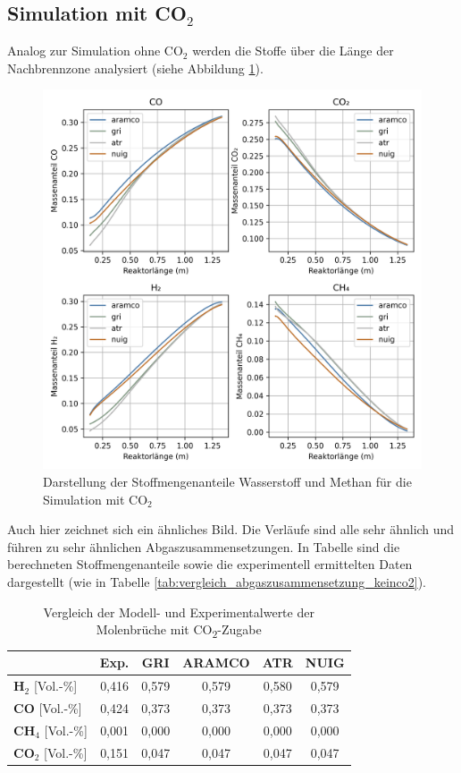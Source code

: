 \documentclass[footmark=none]{tubaf-thesis}
\begin{document}
        \subsection{Simulation mit CO$_2$}
        Analog zur Simulation ohne CO$_2$ werden die Stoffe über die Länge der Nachbrennzone analysiert (siehe Abbildung \ref{fig:vergleich_h2_ch4_co2}).
        \begin{figure}[H]
            \centering
            \includegraphics[width=0.8\linewidth]{img_py/H2_CH4_CO_CO2.png}
            \caption{Darstellung der Stoffmengenanteile Wasserstoff und Methan für die Simulation mit CO$_2$}
            \label{fig:vergleich_h2_ch4_co2}
        \end{figure}
        Auch hier zeichnet sich ein ähnliches Bild. Die Verläufe sind alle sehr ähnlich und führen zu sehr ähnlichen Abgaszusammensetzungen. In Tabelle sind die berechneten Stoffmengenanteile sowie die experimentell ermittelten Daten dargestellt (wie in Tabelle \ref{tab:vergleich_abgaszusammensetzung_keinco2}).
        \begin{table}[H]
            \centering
            \caption{Vergleich der Modell- und Experimentalwerte der Molenbrüche mit CO\textsubscript{2}-Zugabe}
            \begin{tabular}{lccccc}
                \toprule
                & \textbf{Exp.} & \textbf{GRI} & \textbf{ARAMCO} & \textbf{ATR} & \textbf{NUIG} \\
                \midrule
                \textbf{H$_2$} [Vol.-\%]& 0,416 & 0,579 & 0,579 & 0,580 & 0,579 \\
                \textbf{CO} [Vol.-\%]& 0,424 & 0,373 & 0,373 & 0,373 & 0,373 \\
                \textbf{CH$_4$} [Vol.-\%]& 0,001 & 0,000 & 0,000 & 0,000 & 0,000 \\
                \textbf{CO$_2$} [Vol.-\%]& 0,151 & 0,047 & 0,047 & 0,047 & 0,047 \\
                \bottomrule
            \end{tabular}
        \end{table}
\end{document}
